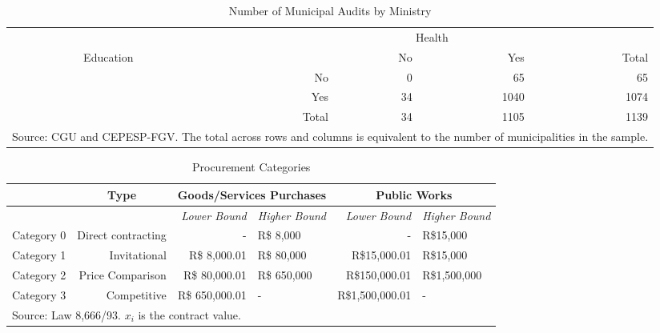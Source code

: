 \documentclass[11pt]{article}
\newcommand\T{\rule{0pt}{2.6ex}}       %
\newcommand\B{\rule[-1.2ex]{0pt}{0pt}} %
\begin{document}
\begin{table}[!htbp]
  \caption{\label{tab:auditbyministry}Number of Municipal Audits by Ministry}
  \centering
  \small
  \begin{tabular}{crrrr}
    \hline

    \hline
    & \multicolumn{4}{c}{\parbox{.25\textwidth}{\centering Health}} \T \B \\
    \multicolumn{1}{c}{\multirow{4}{*}{\parbox[c][][c]{.15\textwidth}{\centering Education}}} & \multicolumn{1}{l}{} & No & Yes & Total \T \B \\
                         \cline{2-5}
    \multicolumn{1}{c}{} & No    & 0  & 65   & 65   \T \B \\
    \multicolumn{1}{c}{} & Yes   & 34 & 1040 & 1074 \T \B \\
                         \cline{2-5}
    \multicolumn{1}{c}{} & Total & 34 & 1105 & 1139 \T \B \\
    \hline

    \hline
    \multicolumn{5}{p{.43\textwidth}}{\footnotesize Source: CGU and CEPESP-FGV. The total across rows and columns is equivalent to the number of municipalities in the sample.} \T
  \end{tabular}
\end{table}

\begin{table}[!htbp]
  \caption{\label{tab:procurementtypes} Procurement Categories}
  \centering

  \small
  \begin{tabular}{crrlrl}
  \hline

  \hline
  & \multicolumn{1}{c}{Type} & \multicolumn{2}{c}{Goods/Services Purchases} & \multicolumn{2}{c}{Public Works} \T \B    \\
  \hline
             &                    & \emph{Lower Bound} & \emph{Higher Bound} & \emph{Lower Bound} & \emph{Higher Bound} \T \B \\
  \hline
  Category 0 & Direct contracting & -                  & R\$ 8,000           & -                  & R\$15,000           \T \B \\
  Category 1 & Invitational       & R\$ 8,000.01       & R\$ 80,000          & R\$15,000.01       & R\$15,000           \T \B \\
  Category 2 & Price Comparison   & R\$ 80,000.01      & R\$ 650,000         & R\$150,000.01      & R\$1,500,000        \T \B \\
  Category 3 & Competitive        & R\$ 650,000.01     & -                   & R\$1,500,000.01    & -                   \T \B \\
  \hline

  \hline
  \multicolumn{6}{l}{\footnotesize Source: Law 8,666/93. $x_{i}$ is the contract value.} \T
  \end{tabular}
\end{table}
\end{document}
